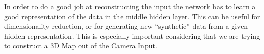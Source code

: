 In order to do a good job at reconstructing the input the network has to learn a good representation of the data in the middle hidden layer. This can be useful for dimensionality reduction, or for generating new “synthetic” data from a given hidden representation. This is especially important considering that we are trying to construct a 3D Map out of the Camera Input. 









